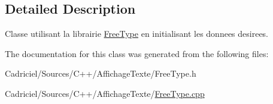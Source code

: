 \subsection{Detailed Description}
Classe utilisant la librairie \hyperlink{class_free_type}{Free\-Type} en initialisant les donnees desirees. 

The documentation for this class was generated from the following files\-:\begin{DoxyCompactItemize}
\item 
Cadriciel/\-Sources/\-C++/\-Affichage\-Texte/Free\-Type.\-h\item 
Cadriciel/\-Sources/\-C++/\-Affichage\-Texte/\hyperlink{_free_type_8cpp}{Free\-Type.\-cpp}\end{DoxyCompactItemize}

